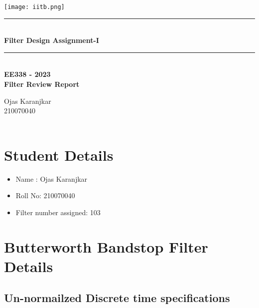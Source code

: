 \documentclass{article}
\begin{document}
\begin{titlepage}
\begin{center}
    \vspace*{\fill}
\texttt{[image: iitb.png]}\\
[4 cm]
    \rule{12.5cm}{0.75mm}\\
    \huge{\bfseries Filter Design Assignment-I}
    \rule{12.5cm}{0.75mm}\\
    [0.5cm]
   {\textbf {EE338 - 2023 \\
    Filter Review Report}}\\
    [2.5cm]
\end{center}
\begin{flushleft}
   {\huge
    Ojas Karanjkar \\
    210070040 \\
     \\}
    \end{flushleft}
\end{titlepage}
\tableofcontents
\thispagestyle{empty}
\clearpage
{}

\newpage

\section{Student Details}
\begin{itemize}
    \item Name : Ojas Karanjkar
    \item Roll No: 210070040
    \item Filter number assigned: 103
\end{itemize}

\section{Butterworth Bandstop Filter Details}
\subsection{Un-normailzed Discrete time specifications}
\end{document}
